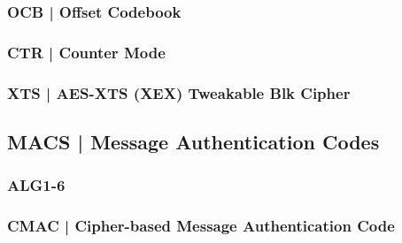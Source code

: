 
\textsf{\small }

\subsubsection{OCB | Offset Codebook} %


\textsf{\small }

\subsubsection{CTR | Counter Mode}


\textsf{\small }

\subsubsection{XTS | AES-XTS (XEX) Tweakable Blk Cipher}


\textsf{\small }



\subsection{MACS | Message Authentication Codes}


\textsf{\small }

\subsubsection{ALG1-6}


\textsf{\small }

\subsubsection{CMAC | Cipher-based Message Authentication Code}

